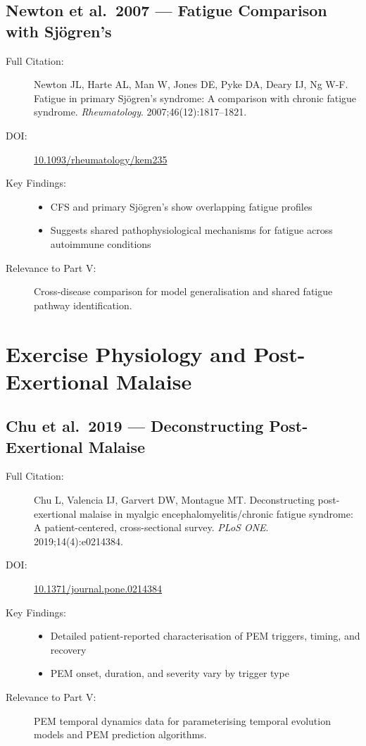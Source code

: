 \subsection{Newton et al.\ 2007 --- Fatigue Comparison with Sj\"{o}gren's}

\begin{description}
    \item[Full Citation:] Newton JL, Harte AL, Man W, Jones DE, Pyke DA, Deary IJ, Ng W-F. Fatigue in primary Sj\"{o}gren's syndrome: A comparison with chronic fatigue syndrome. \textit{Rheumatology}. 2007;46(12):1817--1821. \cite{Newton2007}
    \item[DOI:] \href{https://doi.org/10.1093/rheumatology/kem235}{10.1093/rheumatology/kem235}
    \item[Key Findings:]
    \begin{itemize}
        \item CFS and primary Sj\"{o}gren's show overlapping fatigue profiles
        \item Suggests shared pathophysiological mechanisms for fatigue across autoimmune conditions
    \end{itemize}
    \item[Relevance to Part V:] Cross-disease comparison for model generalisation and shared fatigue pathway identification.
\end{description}

\section{Exercise Physiology and Post-Exertional Malaise}
\label{sec:bib-exercise-pem-additions}

\subsection{Chu et al.\ 2019 --- Deconstructing Post-Exertional Malaise}

\begin{description}
    \item[Full Citation:] Chu L, Valencia IJ, Garvert DW, Montague MT. Deconstructing post-exertional malaise in myalgic encephalomyelitis/chronic fatigue syndrome: A patient-centered, cross-sectional survey. \textit{PLoS ONE}. 2019;14(4):e0214384. \cite{Chu2019}
    \item[DOI:] \href{https://doi.org/10.1371/journal.pone.0214384}{10.1371/journal.pone.0214384}
    \item[Key Findings:]
    \begin{itemize}
        \item Detailed patient-reported characterisation of PEM triggers, timing, and recovery
        \item PEM onset, duration, and severity vary by trigger type
    \end{itemize}
    \item[Relevance to Part V:] PEM temporal dynamics data for parameterising temporal evolution models and PEM prediction algorithms.
\end{description}

